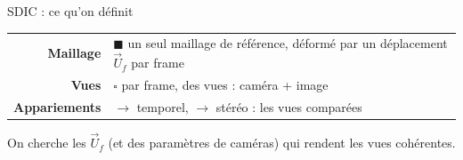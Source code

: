 \documentclass[aspectratio=169,11pt]{beamer}
\begin{document}
\begin{frame}{SDIC : ce qu'on définit}
  \smallskip
  \scriptsize
  \begin{tabular}{@{}r@{\quad}l@{}}
    \textbf{Maillage} & \textcolor{pyorange}{$\blacksquare$} un seul maillage de référence, déformé
      par un déplacement $\vec{U}_f$ par frame \\
    \textbf{Vues} & \textcolor{pypurple}{$\square$} par frame, des vues :
      \textcolor{pyblue}{caméra} + \textcolor{pygreen}{image} \\
    \textbf{Appariements} & \textcolor{pyred}{$\rightarrow$} temporel,
      \textcolor{pyblue}{$\rightarrow$} stéréo : les vues comparées \\
  \end{tabular}
 
  \smallskip
  \small On cherche les $\vec{U}_f$ (et des paramètres de caméras) qui rendent les vues
  \alert{cohérentes}.
\end{frame}
\end{document}
